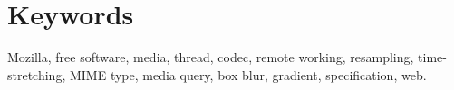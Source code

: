 \documentclass[a4paper,10pt]{article}
\begin{document}
\section*{Keywords}
Mozilla, free software, media, thread, codec, remote working, resampling,
time-stretching, MIME type, media query, box blur, gradient, specification, web.

{\footnotesize
\tableofcontents
}

\clearpage

\begin{multicols}{2}


%
%

\end{multicols}
\end{document}
